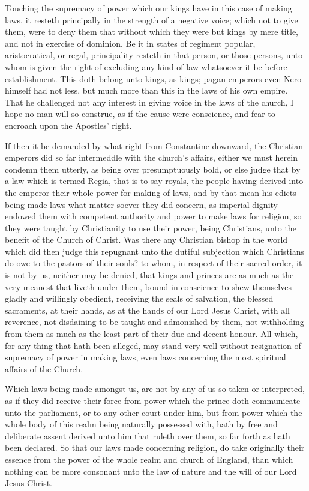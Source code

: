 Touching the supremacy of power which our kings have in this case of making laws, it resteth principally in the strength of a negative voice; which not to give them, were to deny them that without which they were but kings by mere title, and not in exercise of dominion. Be it in states of regiment popular, aristocratical, or regal, principality resteth in that person, or those persons, unto whom is given the right of excluding any kind of law whatsoever it be before establishment. This doth belong unto kings, as kings; pagan emperors even Nero himself had not less, but much more than this in the laws of his own empire. That he challenged not any interest in giving voice in the laws of the church, I hope no man will so construe, as if the cause were conscience, and fear to encroach upon the Apostles’ right.

If then it be demanded by what right from Constantine downward, the Christian emperors did so far intermeddle with the church’s affairs, either we must herein condemn them utterly, as being over presumptuously bold, or else judge that by a law which is termed Regia, that is to say royals, the people having derived into the emperor their whole power for making of laws, and by that mean his edicts being made laws what matter soever they did concern, as imperial dignity endowed them with competent authority and power to make laws for religion, so they were taught by Christianity to use their power, being Christians, unto the benefit of the Church of Christ. Was there any Christian bishop in the world which did then judge this repugnant unto the dutiful subjection which Christians do owe to the pastors of their souls? to whom,  in respect of their sacred order, it is not by us, neither may be denied, that kings and princes are as much as the very meanest that liveth under them, bound in conscience to shew themselves gladly and willingly obedient, receiving the seals of salvation, the blessed sacraments, at their hands, as at the hands of our Lord Jesus Christ, with all reverence, not disdaining to be taught and admonished by them, not withholding from them as much as the least part of their due and decent honour. All which, for any thing that hath been alleged, may stand very well without resignation of supremacy of power in making laws, even laws concerning the most spiritual affairs of the Church.

Which laws being made amongst us, are not by any of us so taken or interpreted, as if they did receive their force from power which the prince doth communicate unto the parliament, or to any other court under him, but from power which the whole body of this realm being naturally possessed with, hath by free and deliberate assent derived unto him that ruleth over them, so far forth as hath been declared. So that our laws made concerning religion, do take originally their essence from the power of the whole realm and church of England, than which nothing can be more consonant unto the law of nature and the will of our Lord Jesus Christ.

